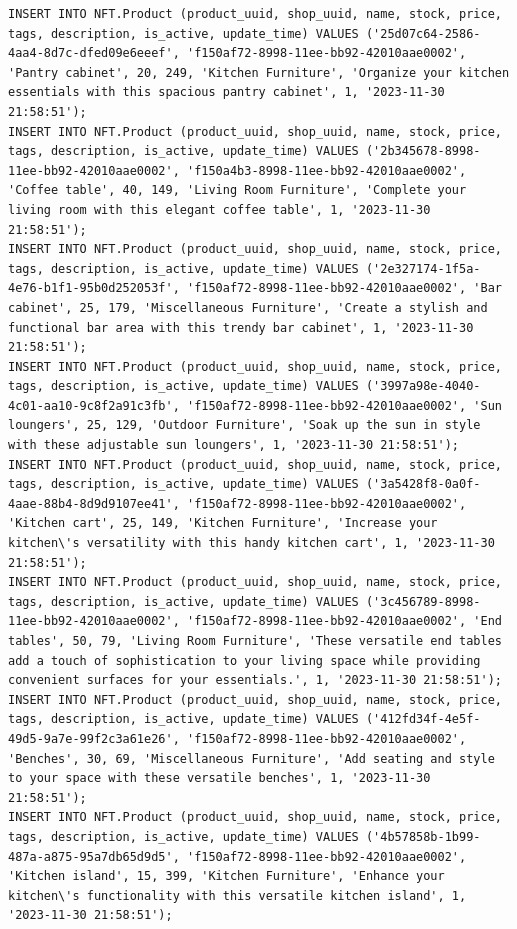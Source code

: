 \documentclass[a4paper, 12pt]{article}
\begin{document}
\begin{lstlisting}
INSERT INTO NFT.Product (product_uuid, shop_uuid, name, stock, price, tags, description, is_active, update_time) VALUES ('25d07c64-2586-4aa4-8d7c-dfed09e6eeef', 'f150af72-8998-11ee-bb92-42010aae0002', 'Pantry cabinet', 20, 249, 'Kitchen Furniture', 'Organize your kitchen essentials with this spacious pantry cabinet', 1, '2023-11-30 21:58:51');
INSERT INTO NFT.Product (product_uuid, shop_uuid, name, stock, price, tags, description, is_active, update_time) VALUES ('2b345678-8998-11ee-bb92-42010aae0002', 'f150a4b3-8998-11ee-bb92-42010aae0002', 'Coffee table', 40, 149, 'Living Room Furniture', 'Complete your living room with this elegant coffee table', 1, '2023-11-30 21:58:51');
INSERT INTO NFT.Product (product_uuid, shop_uuid, name, stock, price, tags, description, is_active, update_time) VALUES ('2e327174-1f5a-4e76-b1f1-95b0d252053f', 'f150af72-8998-11ee-bb92-42010aae0002', 'Bar cabinet', 25, 179, 'Miscellaneous Furniture', 'Create a stylish and functional bar area with this trendy bar cabinet', 1, '2023-11-30 21:58:51');
INSERT INTO NFT.Product (product_uuid, shop_uuid, name, stock, price, tags, description, is_active, update_time) VALUES ('3997a98e-4040-4c01-aa10-9c8f2a91c3fb', 'f150af72-8998-11ee-bb92-42010aae0002', 'Sun loungers', 25, 129, 'Outdoor Furniture', 'Soak up the sun in style with these adjustable sun loungers', 1, '2023-11-30 21:58:51');
INSERT INTO NFT.Product (product_uuid, shop_uuid, name, stock, price, tags, description, is_active, update_time) VALUES ('3a5428f8-0a0f-4aae-88b4-8d9d9107ee41', 'f150af72-8998-11ee-bb92-42010aae0002', 'Kitchen cart', 25, 149, 'Kitchen Furniture', 'Increase your kitchen\'s versatility with this handy kitchen cart', 1, '2023-11-30 21:58:51');
INSERT INTO NFT.Product (product_uuid, shop_uuid, name, stock, price, tags, description, is_active, update_time) VALUES ('3c456789-8998-11ee-bb92-42010aae0002', 'f150af72-8998-11ee-bb92-42010aae0002', 'End tables', 50, 79, 'Living Room Furniture', 'These versatile end tables add a touch of sophistication to your living space while providing convenient surfaces for your essentials.', 1, '2023-11-30 21:58:51');
INSERT INTO NFT.Product (product_uuid, shop_uuid, name, stock, price, tags, description, is_active, update_time) VALUES ('412fd34f-4e5f-49d5-9a7e-99f2c3a61e26', 'f150af72-8998-11ee-bb92-42010aae0002', 'Benches', 30, 69, 'Miscellaneous Furniture', 'Add seating and style to your space with these versatile benches', 1, '2023-11-30 21:58:51');
INSERT INTO NFT.Product (product_uuid, shop_uuid, name, stock, price, tags, description, is_active, update_time) VALUES ('4b57858b-1b99-487a-a875-95a7db65d9d5', 'f150af72-8998-11ee-bb92-42010aae0002', 'Kitchen island', 15, 399, 'Kitchen Furniture', 'Enhance your kitchen\'s functionality with this versatile kitchen island', 1, '2023-11-30 21:58:51');

\end{lstlisting}
\end{document}
